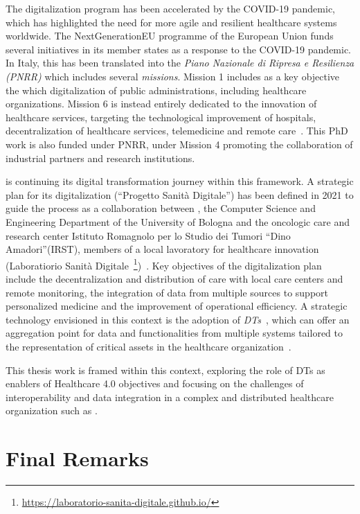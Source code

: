 The digitalization program has been accelerated by the COVID-19 pandemic, which has highlighted the need for more agile and resilient healthcare systems worldwide.
%
The NextGenerationEU programme of the European Union funds several initiatives in its member states as a response to the COVID-19 pandemic. 
%
In Italy, this has been translated into the \emph{Piano Nazionale di Ripresa e Resilienza (PNRR)} which includes several \emph{missions}.
Mission 1 includes as a key objective the which digitalization of public administrations, including healthcare organizations. 
Mission 6 is instead entirely dedicated to the innovation of healthcare services, targeting the technological improvement of hospitals, decentralization of healthcare services, telemedicine and remote care~\cite{italy_pnrr_2021}.
%
This PhD work is also funded under PNRR, under Mission 4 promoting the collaboration of industrial partners and research institutions.

\ausl{} is continuing its digital transformation journey within this framework.
%
A strategic plan for its digitalization (``Progetto Sanità Digitale'') has been defined in 2021 to guide the process as a collaboration between \ausl{}, the Computer Science and Engineering Department of the University of Bologna and the oncologic care and research center {Istituto Romagnolo per lo Studio dei Tumori ``Dino Amadori''(IRST)}, members of a local lavoratory for healthcare innovation (Laboratiorio Sanità Digitale~\footnote{\url{https://laboratorio-sanita-digitale.github.io/}})~\cite{progetto_sanità_digitale}.
%
Key objectives of the digitalization plan include the decentralization and distribution of care with local care centers and remote monitoring, the integration of data from multiple sources to support personalized medicine and the improvement of operational efficiency. 
%
A strategic technology envisioned in this context is the adoption of \emph{\acp{DT}~\cite{Grieves_2023}}, which can offer an aggregation point for data and functionalities from multiple systems tailored to the representation of critical assets in the healthcare organization~\cite{progetto_sanità_digitale}.

This thesis work is framed within this context, exploring the role of \acp{DT} as enablers of Healthcare 4.0 objectives and focusing on the challenges of interoperability and data integration in a complex and distributed healthcare organization such as \ausl{}.

\section{Final Remarks}

